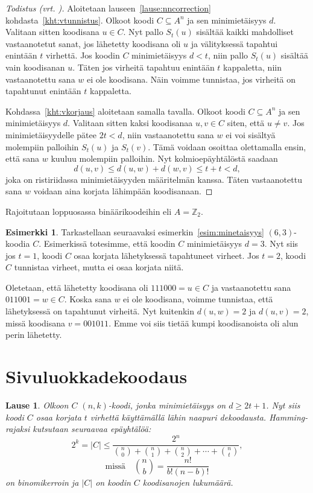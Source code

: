 \documentclass[a4paper,12pt,leqno,oneside]{report} %
\theoremstyle{plain}
\newtheorem{lause}{Lause}[chapter]
\theoremstyle{plain}
\theoremstyle{definition}
\newtheorem{esimerkki}{Esimerkki}[chapter]
\theoremstyle{remark}
\numberwithin{equation}{chapter}
\newcommand*{\Zset}{\mathbb{Z}}  %
\newcommand*{\abs}[1]{\left\lvert#1\right\rvert}   %
\begin{document}
    \begin{proof}[Todistus \upshape(vrt. {\cite[s.~494]{PA}})]\label{tod:nncorrection}
        Aloitetaan lauseen~\ref{lause:nncorrection} kohdasta~\ref{kht:vtunnistus}. Olkoot koodi $C \subseteq A^n$ ja sen minimietäisyys $d$. Valitaan sitten koodisana $u \in C$. Nyt pallo $S_t(u)$ sisältää kaikki mahdolliset vastaanotetut sanat, jos lähetetty koodisana oli $u$ ja välityksessä tapahtui enintään $t$ virhettä. Jos koodin $C$ minimietäisyys $d < t$, niin pallo $S_t(u)$ sisältää vain koodisanan $u$. Täten jos virheitä tapahtuu enintään $t$ kappaletta, niin vastaanotettu sana $w$ ei ole koodisana. Näin voimme tunnistaa, jos virheitä on tapahtunut enintään $t$ kappaletta.

        Kohdassa~\ref{kht:vkorjaus} aloitetaan samalla tavalla. Olkoot koodi $C \subseteq A^n$ ja sen minimietäisyys $d$. Valitaan sitten kaksi koodisanaa $u, v \in C$ siten, että $u \neq v$. Jos minimietäisyydelle pätee $2t < d$, niin vastaanotettu sana $w$ ei voi sisältyä molempiin palloihin $S_t(u)$ ja $S_t(v)$. Tämä voidaan osoittaa olettamalla ensin, että sana $w$ kuuluu molempiin palloihin. Nyt kolmioepäyhtälöstä saadaan
        \[
            d(u,v) \le d(u,w) + d(w, v) \le t + t < d,
        \]
        joka on ristiriidassa minimietäisyyden määritelmän kanssa. Täten vastaanotettu sana $w$ voidaan aina korjata lähimpään koodisanaan.
    \end{proof}

    Rajoitutaan loppuosassa binäärikoodeihin eli $A = \Zset_2$.
    \begin{esimerkki}
        Tarkastellaan seuraavaksi esimerkin~\ref{esim:minetaisyys} $(6,3)$-koodia $C$. Esimerkissä totesimme, että koodin $C$ minimietäisyys $d = 3$. Nyt siis jos $t = 1$, koodi $C$ osaa korjata lähetyksessä tapahtuneet virheet. Jos $t = 2$, koodi $C$ tunnistaa virheet, mutta ei osaa korjata niitä.

        Oletetaan, että lähetetty koodisana oli $111000 = u \in C$ ja vastaanotettu sana $011001= w \in C$. Koska sana $w$ ei ole koodisana, voimme tunnistaa, että lähetyksessä on tapahtunut virheitä. Nyt kuitenkin $d(u,w) = 2$ ja $d(u,v) = 2$, missä koodisana $v = 001011$. Emme voi siis tietää kumpi koodisanoista oli alun perin lähetetty.
    \end{esimerkki}

    \section{Sivuluokkadekoodaus}
    \begin{lause}\label{lause:Hammingraja}
        Olkoon $C$ $(n, k)$-koodi, jonka minimietäisyys on $d \ge 2t +1$. Nyt siis koodi $C$ osaa korjata $t$ virhettä käyttämällä lähin naapuri dekoodausta. Hamming-rajaksi kutsutaan seuraavaa epäyhtälöä:
        \[
            2^k = \abs{C} \le \frac{2^n}{\binom{n}{0}+\binom{n}{1}+\binom{n}{2}+\cdots+\binom{n}{t}},
        \]
        \[
            \text{missä} \quad \binom{n}{b} = \frac{n!}{b!(n-b)!}
        \]
        on binomikerroin ja $\abs{C}$ on koodin $C$ koodisanojen lukumäärä.
    \end{lause}
\end{document}
